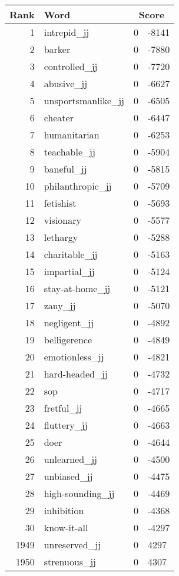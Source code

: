 \begin{longtable}[!htbp]{| rlr@{.}l |}
    \hline
    \textbf{Rank} & \textbf{Word} & \multicolumn{2}{c|}{\textbf{Score}} \\
    \hline
    \endhead
    1 & intrepid\_jj & 0 & -8141 \\
    2 & barker & 0 & -7880 \\
    3 & controlled\_jj & 0 & -7720 \\
    4 & abusive\_jj & 0 & -6627 \\
    5 & unsportsmanlike\_jj & 0 & -6505 \\
    6 & cheater & 0 & -6447 \\
    7 & humanitarian & 0 & -6253 \\
    8 & teachable\_jj & 0 & -5904 \\
    9 & baneful\_jj & 0 & -5815 \\
    10 & philanthropic\_jj & 0 & -5709 \\
    11 & fetishist & 0 & -5693 \\
    12 & visionary & 0 & -5577 \\
    13 & lethargy & 0 & -5288 \\
    14 & charitable\_jj & 0 & -5163 \\
    15 & impartial\_jj & 0 & -5124 \\
    16 & stay-at-home\_jj & 0 & -5121 \\
    17 & zany\_jj & 0 & -5070 \\
    18 & negligent\_jj & 0 & -4892 \\
    19 & belligerence & 0 & -4849 \\
    20 & emotionless\_jj & 0 & -4821 \\
    21 & hard-headed\_jj & 0 & -4732 \\
    22 & sop & 0 & -4717 \\
    23 & fretful\_jj & 0 & -4665 \\
    24 & fluttery\_jj & 0 & -4663 \\
    25 & doer & 0 & -4644 \\
    26 & unlearned\_jj & 0 & -4500 \\
    27 & unbiased\_jj & 0 & -4475 \\
    28 & high-sounding\_jj & 0 & -4469 \\
    29 & inhibition & 0 & -4368 \\
    30 & know-it-all & 0 & -4297 \\
    1949 & unreserved\_jj & 0 & 4297 \\
    1950 & strenuous\_jj & 0 & 4307 \\

\end{longtable}
